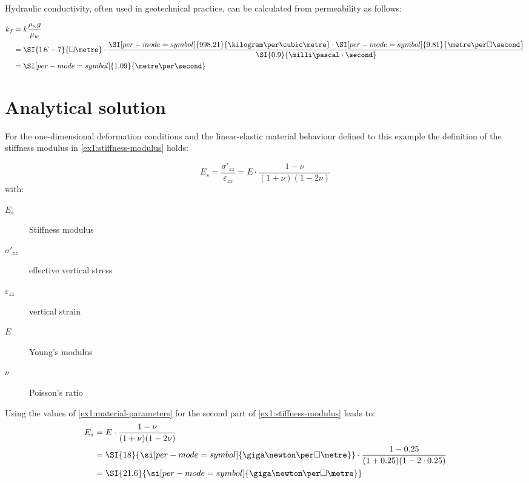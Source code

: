 Hydraulic conductivity, often used in geotechnical practice, can be calculated
from permeability as follows:

\begin{equation}
    \begin{split}
        k_f & = k \frac{\rho_w g}{\mu_w}                                                                                                                                                                            \\
            & = \SI{1E-7}{\square\metre} \cdot \frac{\SI[per-mode = symbol]{998.21}{\kilogram\per\cubic\metre} \cdot \SI[per-mode = symbol]{9.81}{\metre\per\square\second}}{ \SI{0.9}{\milli\pascal\cdot\second} } \\
            & = \SI[per-mode = symbol]{1.09}{\metre\per\second}                                                                                                                                                     %
    \end{split}
\end{equation}

\section{Analytical solution}

For the one-dimensional deformation conditions and the linear-elastic material
behaviour defined to this example the definition of the stiffness modulus in
\autoref{ex1:stiffness-modulus} holds:

\begin{equation}
    \label{ex1:stiffness-modulus}
    E_s = \frac{\sigma'_{zz}}{\varepsilon_{zz}} = E \cdot \frac{1 - \nu}{(1 + \nu)(1 - 2 \nu)}
\end{equation}
with:
\begin{description}
    \item[$E_s$] Stiffness modulus
    \item[$\sigma'_{zz}$] effective vertical stress
    \item[$\varepsilon_{zz}$] vertical strain
    \item[$E$] Young's modulus
    \item[$\nu$] Poisson's ratio
\end{description}

Using the values of \autoref{ex1:material-parameters} for the second part of
\autoref{ex1:stiffness-modulus} leads to:
\begin{equation}
    \label{ex1:stiffness-modulus-value}
    \begin{split}
        E_s & = E \cdot \frac{1 - \nu}{(1 + \nu)(1 - 2 \nu)}                                                                       \\
            & = \SI{18}{\si[per-mode = symbol]{\giga\newton\per\square\metre}} \cdot \frac{1 - 0.25}{(1 + 0.25)(1 - 2 \cdot 0.25)} \\
            & = \SI{21.6}{\si[per-mode = symbol]{\giga\newton\per\square\metre}}
    \end{split}
\end{equation}

